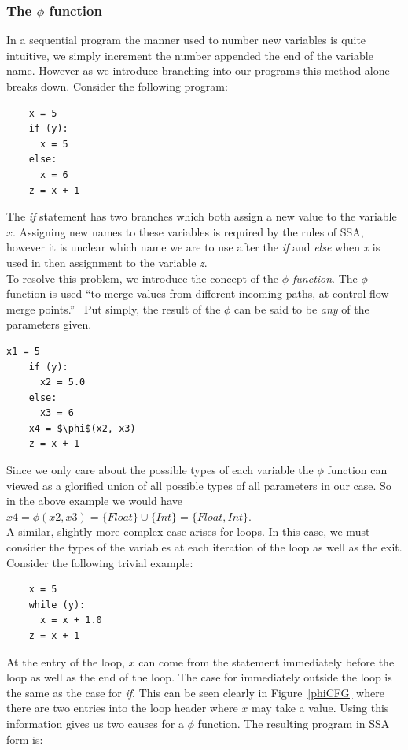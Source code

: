\documentclass[12pt, titlepage]{article}
\begin{document}
\subsubsection{The $\phi$ function}
In a sequential program the manner used to number new variables is quite intuitive, we simply increment the number appended the end of the variable name. However as we introduce branching into our programs this method alone breaks down. Consider the following program:
\begin{lstlisting}
	x = 5
	if (y):
	  x = 5
	else:
	  x = 6
	z = x + 1
\end{lstlisting}
The \textit{if} statement has two branches which both assign a new value to the variable $x$. Assigning new names to these variables is required by the rules of SSA, however it is unclear which name we are to use after the \textit{if} and \textit{else} when \textit{x} is used in then assignment to the variable \textit{z}. \\
To resolve this problem, we introduce the concept of the \emph{$\phi$ function}. The $\phi$ function is used ``to merge values from different incoming paths, at control-flow merge points.''~\cite{ssaBook} Put simply, the result of the $\phi$ can be said to be \emph{any} of the parameters given. 
\begin{lstlisting}[mathescape]
	x1 = 5
	if (y):
	  x2 = 5.0
	else:
	  x3 = 6
	x4 = $\phi$(x2, x3)
	z = x + 1
\end{lstlisting}
Since we only care about the possible types of each variable the $\phi$ function can viewed as a glorified union of all possible types of all parameters in our case. So in the above example we would have $x4 = \phi(x2, x3) = \{Float\} \cup \{Int\} = \{Float, Int\}$. \\
A similar, slightly more complex case arises for loops. In this case, we must consider the types of the variables at each iteration of the loop as well as the exit. Consider the following trivial example:
\begin{lstlisting}
	x = 5
	while (y):
	  x = x + 1.0
	z = x + 1
\end{lstlisting}
At the entry of the loop, $x$ can come from the statement immediately before the loop as well as the end of the loop. The case for immediately outside the loop is the same as the case for \textit{if}. This can be seen clearly in Figure~\ref{phiCFG} where there are two entries into the loop header where $x$ may take a value. Using this information gives us two causes for a $\phi$ function. The resulting program in SSA form is:
\end{document}
